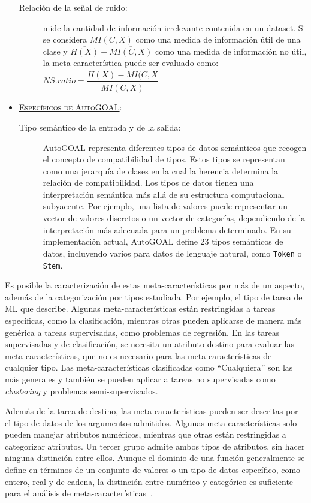 \begin{itemize}
\begin{description}
		\item[Relación de la señal de ruido:]  mide la cantidad de información irrelevante contenida en un dataset. Si se considera $\overline{MI(C, X)}$ como una medida de información útil de una clase y $\overline{H(X)} - \overline{MI(C, X)}$ como una medida de información no útil, la meta-característica puede ser evaluado como: $NS.ratio = \dfrac{\overline{H(X)} - \overline{MI(C, X}}{\overline{MI(C, X)}}$
	\end{description}
	\item \textsc{\underline{Específicos de AutoGOAL}}: \begin{description}
		\item[Tipo semántico de la entrada y de la salida:] AutoGOAL representa diferentes tipos de datos semánticos que recogen el concepto de compatibilidad de tipos. Estos tipos se representan como una jerarquía de clases en la cual la herencia determina la relación de compatibilidad. Los tipos de datos tienen una interpretación semántica más allá de su estructura computacional subyacente. Por ejemplo, una lista de valores puede representar un vector de valores discretos o un vector de categorías, dependiendo de la interpretación más adecuada para un problema determinado. En su implementación actual, AutoGOAL define 23 tipos semánticos de datos, incluyendo varios para datos de lenguaje natural, como \texttt{Token} o \texttt{Stem}.
	\end{description}
\end{itemize}

Es posible la caracterización de estas meta-características por más de un aspecto, además de la categorización por tipos estudiada. Por ejemplo, el tipo de tarea de ML que describe. Algunas meta-características están restringidas a tareas específicas, como la clasificación, mientras otras pueden aplicarse de manera más genérica a tareas supervisadas, como problemas de regresión. En las tareas supervisadas y de clasificación, se necesita un atributo destino para evaluar las meta-características, que no es necesario para las meta-características de cualquier tipo. Las meta-características clasificadas como ``Cualquiera'' son las más generales y también se pueden aplicar a tareas no supervisadas como \textit{clustering} y problemas semi-supervisados. 

Además de la tarea de destino, las meta-características pueden ser descritas por el tipo de datos de los argumentos admitidos. Algunas meta-características solo pueden manejar atributos numéricos, mientras que otras están restringidas a categorizar atributos. Un tercer grupo admite ambos tipos de atributos, sin hacer ninguna distinción entre ellos. Aunque el dominio de una función generalmente se define en términos de un conjunto de valores o un tipo de datos específico, como entero, real y de cadena, la distinción entre numérico y categórico es suficiente para el análisis de meta-características~\cite{Rivolli2018TowardsRE}.  

